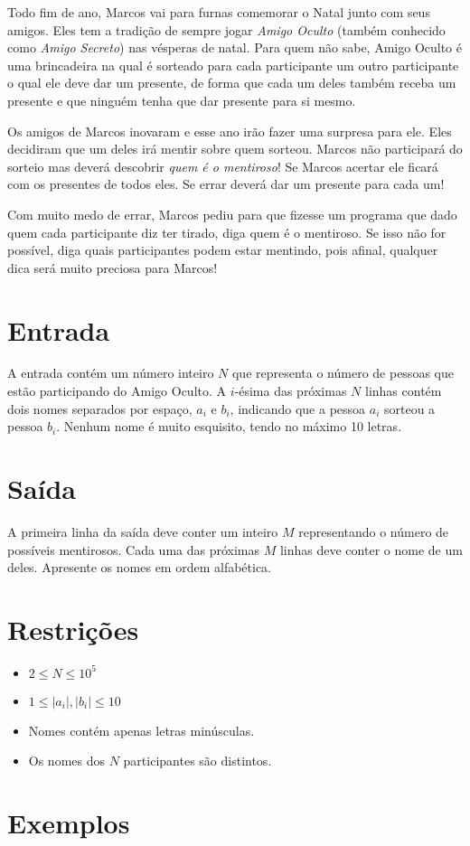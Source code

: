 Todo fim de ano, Marcos vai para furnas comemorar o Natal junto com seus amigos.
Eles tem a tradição de sempre jogar \textit{Amigo Oculto} (também conhecido como 
\textit{Amigo Secreto}) nas vésperas de natal. Para quem não sabe, Amigo Oculto
é uma brincadeira na qual é sorteado para cada participante um outro participante
o qual ele deve dar um presente, de forma que cada um deles também receba um presente e que ninguém tenha que dar presente para si mesmo. 

Os amigos de Marcos inovaram e esse ano irão fazer uma surpresa para ele. Eles decidiram
que um deles irá mentir sobre quem sorteou. Marcos não participará do sorteio mas
deverá descobrir \textit{quem é o mentiroso}! Se Marcos acertar ele ficará com os
presentes de todos eles. Se errar deverá dar um presente para cada um! 

Com muito medo de errar, Marcos pediu para que fizesse um programa que dado quem
cada participante diz ter tirado, diga quem é o mentiroso. Se isso não for possível,
diga quais participantes podem estar mentindo, pois afinal, qualquer dica será
muito preciosa para Marcos!

\section*{Entrada}

A entrada contém um número inteiro $N$ que representa o número de pessoas que estão
participando do Amigo Oculto. A $i$-ésima das próximas $N$ linhas contém dois nomes separados por espaço, $a_i$ e $b_i$,
indicando que a pessoa $a_i$ sorteou a pessoa $b_i$.
Nenhum nome é muito esquisito, tendo no máximo 10 letras.

\section*{Saída}

A primeira linha da saída deve conter um inteiro $M$ representando o número de possíveis mentirosos. Cada uma das próximas $M$ linhas deve
conter o nome de um deles. Apresente os nomes em ordem alfabética.

\section*{Restrições}

\begin{itemize}
\item $2 \le N \le 10^5$
\item $1 \le |a_i|, |b_i| \le 10$
\item Nomes contém apenas letras minúsculas. 
\item Os nomes dos $N$ participantes são distintos.
\end{itemize}

\section*{Exemplos}

\exemplo
